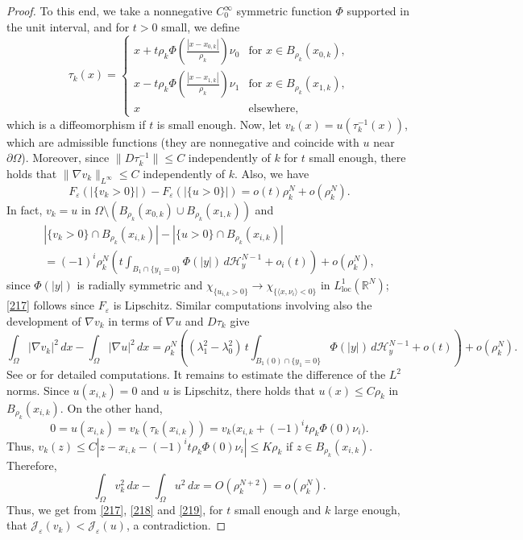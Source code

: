 \documentclass[11pt]{amsart}
\theoremstyle{definition}
\theoremstyle{remark}
\numberwithin{equation}{section}
\newcommand{\R}{\mathbb{R}}
\newcommand{\cH}{\mathcal{H}}
\newcommand{\cJ}{\mathcal{J}}
\begin{document}
\begin{proof}
To this end, we take a nonnegative $C^\infty_0$ symmetric function $\Phi$ supported in the unit interval, and for $t>0$ small, we define
\[
\tau_k(x)=\begin{cases}
x+t\rho_k\Phi\left(\frac{|x-x_{0,k}|}{\rho_k}\right)\nu_0 & \text{for } x\in B_{\rho_k}(x_{0,k}),\\[6pt]
x-t\rho_k\Phi\left(\frac{|x-x_{1,k}|}{\rho_k}\right)\nu_1 & \text{for } x\in B_{\rho_k}(x_{1,k}),\\[6pt]
x & \text{elsewhere},
\end{cases}
\]
which is a diffeomorphism if $t$ is small enough. Now, let $v_k(x)=u(\tau_k^{-1}(x))$, which are admissible functions (they are nonnegative and coincide with $u$ near $\partial\Omega$). Moreover, since $\|D\tau_k^{-1}\|\le C$ independently of $k$ for $t$ small enough, there holds that $\|\nabla v_k\|_{L^\infty}\le C$ independently of $k$. Also, we have
\begin{equation}\label{217}
F_\varepsilon(|\{v_k>0\}|)-F_\varepsilon(|\{u>0\}|)=o(t)\rho_k^N+o(\rho_k^N).
\end{equation}
In fact, $v_k=u$ in $\Omega\setminus(B_{\rho_k}(x_{0,k})\cup B_{\rho_k}(x_{1,k}))$ and
\begin{multline*}
|\{v_k>0\}\cap B_{\rho_k}(x_{i,k})|-|\{u>0\}\cap B_{\rho_k}(x_{i,k})|\\
=(-1)^i\rho_k^N\left(t\int_{B_1\cap\{y_1=0\}}\Phi(|y|)\,d\cH^{N-1}_y+o_i(t)\right)+o(\rho_k^N),
\end{multline*}
since $\Phi(|y|)$ is radially symmetric and $\chi_{\{u_{i,k}>0\}}\to\chi_{\{\langle x,\nu_i\rangle<0\}}$ in $L^1_{\mathrm{loc}}(\R^N)$; \eqref{217} follows since $F_\varepsilon$ is Lipschitz. Similar computations involving also the development of $\nabla v_k$ in terms of $\nabla u$ and $D\tau_k$ give
\begin{equation}\label{218}
\int_\Omega|\nabla v_k|^2\,dx-\int_\Omega|\nabla u|^2\,dx=\rho_k^N\left((\lambda_1^2-\lambda_0^2)\,t\int_{B_1(0)\cap\{y_1=0\}}\Phi(|y|)\,d\cH^{N-1}_y+o(t)\right)+o(\rho_k^N).
\end{equation}
See \cite{AAC} or \cite{Le2} for detailed computations. It remains to estimate the difference of the $L^2$ norms. Since $u(x_{i,k})=0$ and $u$ is Lipschitz, there holds that $u(x)\le C\rho_k$ in $B_{\rho_k}(x_{i,k})$. On the other hand,
\[
0=u(x_{i,k})=v_k(\tau_k(x_{i,k}))=v_k\big(x_{i,k}+(-1)^it\rho_k\Phi(0)\nu_i\big).
\]
Thus, $v_k(z)\le C|z-x_{i,k}-(-1)^it\rho_k\Phi(0)\nu_i|\le K\rho_k$ if $z\in B_{\rho_k}(x_{i,k})$. Therefore,
\begin{equation}\label{219}
\int_\Omega v_k^2\,dx-\int_\Omega u^2\,dx=O(\rho_k^{N+2})=o(\rho_k^N).
\end{equation}
Thus, we get from \eqref{217}, \eqref{218} and \eqref{219}, for $t$ small enough and $k$ large enough, that $\cJ_\varepsilon(v_k)<\cJ_\varepsilon(u)$, a contradiction.
\end{proof}
\end{document}
